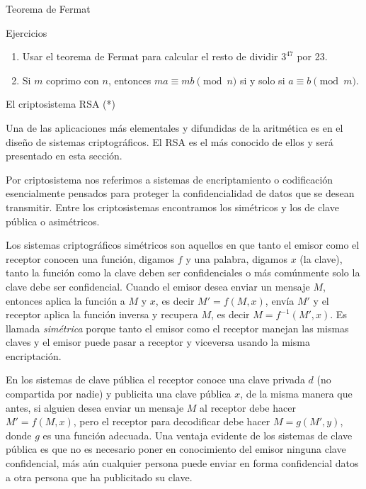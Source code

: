 \documentclass[11pt,spanish,makeidx]{amsbook}
\theoremstyle{definition}
\theoremstyle{remark}
\begin{document}
\begin{section}{Teorema de Fermat}
\begin{subsection}{Ejercicios}
\begin{enumerate}
\item Usar el teorema de Fermat para calcular el resto de dividir $3^{47}$ por 23.
\item Si $m$ coprimo con $n$, entonces $ma\equiv mb \pmod{n}$ si y solo si $a\equiv b\pmod{m}$.
\end{enumerate}
\end{subsection}

\end{section}

\begin{section}{El criptosistema RSA (*)}

Una de las aplicaciones más elementales y difundidas de la aritmética es en el diseño de sistemas criptográficos. El RSA es el más conocido de ellos y será presentado en esta sección. 

Por criptosistema nos referimos a sistemas de encriptamiento o codificación esencialmente pensados para proteger la    confidencialidad de datos que se desean transmitir. Entre los criptosistemas encontramos los simétricos  y los de clave pública o asimétricos.   

Los sistemas criptográficos simétricos son aquellos en que tanto el emisor como el receptor conocen una función, digamos $f$ y una palabra, digamos $x$ (la clave), tanto la función como la clave  deben ser confidenciales o más comúnmente solo la clave debe ser confidencial. Cuando el emisor desea enviar un mensaje $M$, entonces aplica la función a $M$ y $x$, es decir $M'=f(M,x)$, envía $M'$ y el receptor aplica la función inversa y recupera $M$, es decir $M=f^{-1}(M',x)$. Es llamada \emph{simétrica} porque tanto el emisor como el receptor manejan las mismas claves y el emisor puede pasar a receptor y viceversa usando la misma encriptación.   

En los sistemas de clave pública el receptor conoce una clave privada $d$ (no compartida por nadie) y publicita una clave pública $x$, de la misma manera que antes,  si alguien desea enviar un mensaje $M$ al receptor debe hacer $M'=f(M,x)$, pero el receptor para decodificar debe hacer $M=g(M',y)$, donde $g$ es una función adecuada. Una ventaja evidente de los sistemas de clave pública es que no es necesario poner en conocimiento del emisor ninguna clave confidencial, más aún cualquier persona puede enviar en forma confidencial datos a otra persona que ha publicitado su clave.


\end{section}
\end{document}
